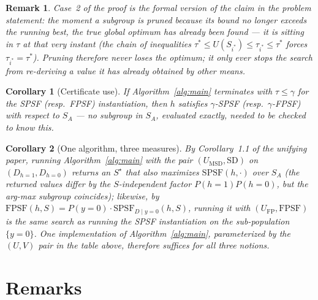 \documentclass[11pt]{article}
\newtheorem{corollary}{Corollary}
\newtheorem{remark}{Remark}
\begin{document}
\begin{remark}
Case~2 of the proof is the formal version of the claim in the problem statement: the
moment a subgroup is pruned because its bound no longer exceeds the running best,
\emph{the true global optimum has already been found} — it is sitting in $\tau$ at
that very instant (the chain of inequalities $\tau^\ast\le U(S_{i^\ast})\le
\tau_{i^\ast}\le\tau^\ast$ forces $\tau_{i^\ast}=\tau^\ast$). Pruning therefore never
loses the optimum; it only ever stops the search from re-deriving a value it has
already obtained by other means.
\end{remark}

\begin{corollary}[Certificate use]
If Algorithm~\ref{alg:main} terminates with $\tau\le\gamma$ for the SPSF (resp.\ FPSF)
instantiation, then $h$ satisfies $\gamma$-SPSF (resp.\ $\gamma$-FPSF) with respect to
$S_A$ — \emph{no} subgroup in $S_A$, evaluated exactly, needed to be checked to know
this.
\end{corollary}

\begin{corollary}[One algorithm, three measures]
By Corollary~1.1 of the unifying paper, running Algorithm~\ref{alg:main} with the pair
$(U_{\mathrm{MSD}},\mathrm{SD})$ on $(D_{h=1},D_{h=0})$ returns an $S^\star$ that also
maximizes $\mathrm{SPSF}(h,\cdot)$ over $S_A$ (the returned \emph{values} differ by the
$S$-independent factor $P(h=1)P(h=0)$, but the arg-max subgroup coincides); likewise,
by $\mathrm{FPSF}(h,S)=P(y=0)\cdot\mathrm{SPSF}_{D\mid y=0}(h,S)$, running it with
$(U_{\mathrm{FP}},\mathrm{FPSF})$ is the same search as running the SPSF instantiation
on the sub-population $\{y=0\}$. One implementation of Algorithm~\ref{alg:main},
parameterized by the $(U,V)$ pair in the table above, therefore suffices for all three
notions.
\end{corollary}

\section{Remarks}
\end{document}
